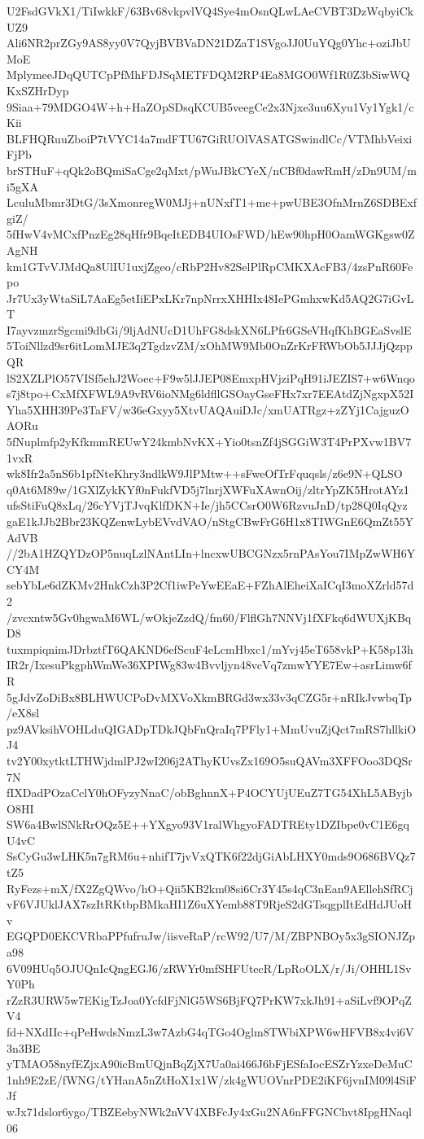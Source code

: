 U2FsdGVkX1/TiIwkkF/63Bv68vkpvlVQ4Sye4mOsnQLwLAeCVBT3DzWqbyiCkUZ9
Ali6NR2prZGy9AS8yy0V7QyjBVBVaDN21DZaT1SVgoJJ0UuYQg0Yhc+oziJbUMoE
MplymeeJDqQUTCpPfMhFDJSqMETFDQM2RP4Ea8MGO0Wf1R0Z3bSiwWQKxSZHrDyp
9Siaa+79MDGO4W+h+HaZOpSDsqKCUB5veegCe2x3Njxe3uu6Xyu1Vy1Ygk1/cKii
BLFHQRuuZboiP7tVYC14a7mdFTU67GiRUOlVASATGSwindlCc/VTMhbVeixiFjPb
brSTHuF+qQk2oBQmiSaCge2qMxt/pWuJBkCYeX/nCBf0dawRmH/zDn9UM/mi5gXA
LculuMbmr3DtG/3sXmonregW0MJj+nUNxfT1+me+pwUBE3OfnMrnZ6SDBExfgiZ/
5fHwV4vMCxfPnzEg28qHfr9BqeItEDB4UIOsFWD/hEw90hpH0OamWGKgsw0ZAgNH
km1GTvVJMdQa8UlIU1uxjZgeo/cRbP2Hv82SelPlRpCMKXAcFB3/4zsPnR60Fepo
Jr7Ux3yWtaSiL7AaEg5etIiEPxLKr7npNrrxXHHIx48IePGmhxwKd5AQ2G7iGvLT
I7ayvzmzrSgcmi9dbGi/9ljAdNUcD1UhFG8dskXN6LPfr6GSeVHqfKhBGEaSvslE
5ToiNllzd9sr6itLomMJE3q2TgdzvZM/xOhMW9Mb0OnZrKrFRWbOb5JJJjQzppQR
lS2XZLPlO57VISf5ehJ2Woec+F9w5lJJEP08EmxpHVjziPqH91iJEZIS7+w6Wnqo
s7j8tpo+CxMfXFWL9A9vRV6ioNMg6ldfllGSOayGseFHx7xr7EEAtdZjNgxpX52I
Yha5XHH39Pe3TaFV/w36eGxyy5XtvUAQAuiDJc/xmUATRgz+zZYj1CajguzOAORu
5fNuplmfp2yKfkmmREUwY24kmbNvKX+Yio0tsnZf4jSGGiW3T4PrPXvw1BV71vxR
wk8Ifr2a5nS6b1pfNteKhry3ndlkW9JlPMtw++sFweOfTrFquqsls/z6e9N+QLSO
q0At6M89w/1GXlZykKYf0nFukfVD5j7lnrjXWFuXAwnOij/zltrYpZK5HrotAYz1
ufsStiFuQ8xLq/26cYVjTJvqKlfDKN+Ie/jh5CCsrO0W6RzvuJnD/tp28Q0IqQyz
gaE1kJJb2Bbr23KQZenwLybEVvdVAO/nStgCBwFrG6H1x8TIWGnE6QmZt55YAdVB
//2bA1HZQYDzOP5nuqLzlNAntLIn+lncxwUBCGNzx5rnPAsYou7IMpZwWH6YCY4M
sebYbLe6dZKMv2HnkCzh3P2Cf1iwPeYwEEaE+FZhAlEheiXaICqI3moXZrld57d2
/zvcxntw5Gv0hgwaM6WL/wOkjeZzdQ/fm60/FlflGh7NNVj1fXFkq6dWUXjKBqD8
tuxmpiqnimJDrbztfT6QAKND6efScuF4eLcmHbxc1/mYvj45eT658vkP+K58p13h
IR2r/IxesuPkgphWmWe36XPIWg83w4Bvvljyn48vcVq7zmwYYE7Ew+asrLimw6fR
5gJdvZoDiBx8BLHWUCPoDvMXVoXkmBRGd3wx33v3qCZG5r+nRIkJvwbqTp/eX8sl
pz9AVksihVOHLduQIGADpTDkJQbFnQraIq7PFly1+MmUvuZjQct7mRS7hllkiOJ4
tv2Y00xytktLTHWjdmlPJ2wI206j2AThyKUvsZx169O5suQAVm3XFFOoo3DQSr7N
fIXDadPOzaCclY0hOFyzyNnaC/obBghnnX+P4OCYUjUEuZ7TG54XhL5AByjbO8HI
SW6a4BwlSNkRrOQz5E++YXgyo93V1ralWhgyoFADTREty1DZIbpe0vC1E6gqU4vC
SsCyGu3wLHK5n7gRM6u+nhifT7jvVxQTK6f22djGiAbLHXY0mds9O686BVQz7tZ5
RyFezs+mX/fX2ZgQWvo/hO+Qii5KB2km08si6Cr3Y45s4qC3nEan9AEllehSfRCj
vF6VJUklJAX7szItRKtbpBMkaHI1Z6uXYemb88T9RjeS2dGTsqgplItEdHdJUoHv
EGQPD0EKCVRbaPPfufruJw/iisveRaP/rcW92/U7/M/ZBPNBOy5x3gSIONJZpa98
6V09HUq5OJUQnIcQngEGJ6/zRWYr0mfSHFUtecR/LpRoOLX/r/Ji/OHHL1SvY0Ph
rZzR3URW5w7EKigTzJoa0YcfdFjNlG5WS6BjFQ7PrKW7xkJh91+aSiLvf9OPqZV4
fd+NXdIIc+qPeHwdsNmzL3w7AzbG4qTGo4Oglm8TWbiXPW6wHFVB8x4vi6V3n3BE
yTMAO58nyfEZjxA90icBmUQjnBqZjX7Ua0ai466J6bFjESfaIocESZrYzxeDeMuC
1nh9E2zE/fWNG/tYHanA5nZtHoX1x1W/zk4gWUOVnrPDE2iKF6jvnIM09l4SiFJf
wJx71dslor6ygo/TBZEebyNWk2nVV4XBFcJy4xGu2NA6nFFGNChvt8IpgHNaql06
